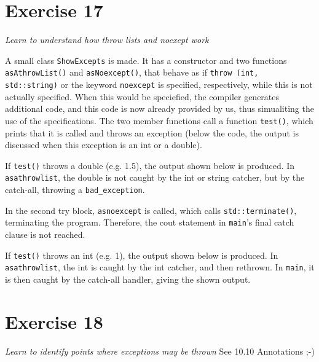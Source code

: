 \documentclass[12pt]{article}
\newcommand{\desc}[1]{\textit{#1} \vspace{1em}}
\begin{document}
\clearpage
\section*{Exercise 17}
\desc{Learn to understand how throw lists and noexept work}

A small class \texttt{ShowExcepts} is made. It has a constructor and two functions \texttt{asAthrowList()} and \texttt{asNoexcept()}, that behave as if \texttt{throw (int, std::string)} or the keyword \texttt{noexcept} is specified, respectively, while this is not actually specified. When this would be speciefied, the compiler generates additional code, and this code is now already provided by us, thus simualiting the use of the specifications. 
The two member functions call a function \texttt{test()}, which prints that it is called and throws an exception (below the code, the output is discussed when this exception is an int or a double). 











If \texttt{test()} throws a double (e.g. 1.5), the output shown below is produced. In \texttt{asathrowlist}, the double is not caught by the int or string catcher, but by the catch-all, throwing a \texttt{bad\_exception}. 

In the second try block, \texttt{asnoexcept} is called, which calls \texttt{std::terminate()}, terminating the program. Therefore, the cout statement in \texttt{main}'s final catch clause is not reached. 



If \texttt{test()} throws an int (e.g. 1), the output shown below is produced. In \texttt{asathrowlist}, the int is caught by the int catcher, and then rethrown. In \texttt{main}, it is then caught by the catch-all handler, giving the shown output. 





\clearpage
\section*{Exercise 18}
\desc{Learn to identify points where exceptions may be thrown}
See 10.10 Annotations ;-)

\clearpage
\end{document}
